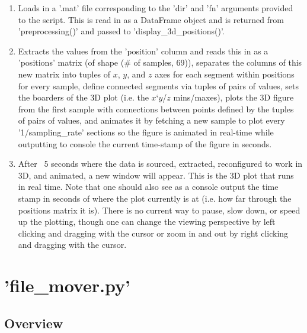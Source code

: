 \documentclass[12pt,twoside]{report}
\begin{document}
\begin{enumerate}
	\item Loads in a '.mat' file corresponding to the 'dir' and 'fn' arguments provided to the script. This is read in as a DataFrame object and is returned from 'preprocessing()' and passed to 'display\_3d\_positions()'.
	\item Extracts the values from the 'position' column and reads this in as a 'positions' matrix (of shape (\# of samples, 69)), separates the columns of this new matrix into tuples of $x$, $y$, and $z$ axes for each segment within positions for every sample, define connected segments via tuples of pairs of values, sets the boarders of the 3D plot (i.e. the $x$$‘y$/$z$ mins/maxes), plots the 3D figure from the first sample with connections between points defined by the tuples of pairs of values, and animates it by fetching a new sample to plot every '1/sampling\_rate' sections so the figure is animated in real-time while outputting to console the current time-stamp of the figure in seconds.
	\item After ~5 seconds where the data is sourced, extracted, reconfigured to work in 3D, and animated, a new window will appear. This is the 3D plot that runs in real time. Note that one should also see as a console output the time stamp in seconds of where the plot currently is at (i.e. how far through the positions matrix it is). There is no current way to pause, slow down, or speed up the plotting, though one can change the viewing perspective by left clicking and dragging with the cursor or zoom in and out by right clicking and dragging with the cursor.
\end{enumerate}



\section{'file\_mover.py'}

\subsection{Overview}
\end{document}
